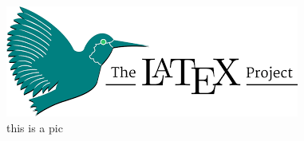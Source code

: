 \documentclass[UTF8]{ctexart}
\begin{document}
	\begin{figure}
		\centering
		\includegraphics[width=0.9\linewidth]{logo/LaTex PJ}
		\caption{this is a pic}
		\label{fig:latex-pj}
	\end{figure}
\end{document}
